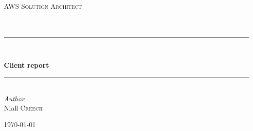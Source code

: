 

	
	
	\begin{titlepage} %
		\newcommand{\HRule}{\rule{\linewidth}{0.5mm}} %
		
		\center %
		
		
		\textsc{\LARGE AWS Solution Architect}\\[1.5cm] 
		
		\textsc{\Large }\\[0.5cm] %
		
		\textsc{\large }\\[0.5cm] %
		
		
		\HRule\\[0.4cm]
		

		\author{Niall Creech}
		{\huge\bfseries Client report }\\[0.4cm] %
		
		\HRule\\[1.5cm]
		

		{\large\textit{Author}}\\
		Niall \textsc{Creech} %
		
		
		\vfill\vfill\vfill %
		
		{\large\today} %
		
		
		
		
		\vfill %
		
	\end{titlepage}
	
